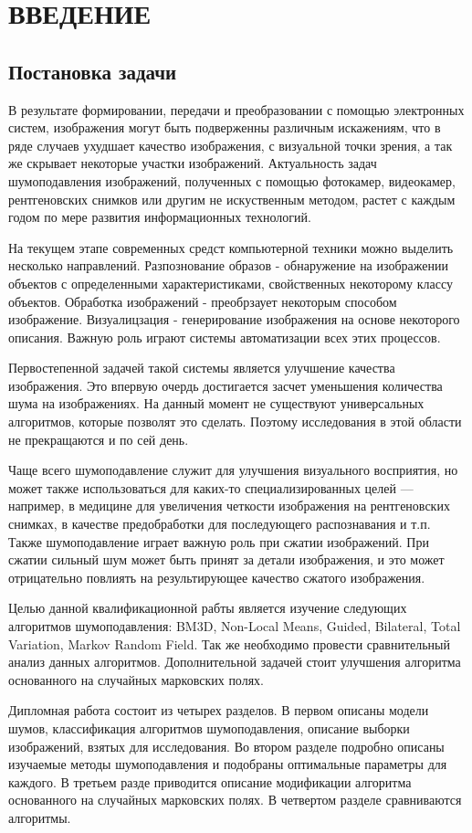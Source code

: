 \section{ВВЕДЕНИЕ}
\subsection{Постановка задачи}
В результате формировании, передачи и преобразовании с помощью электронных систем, изображения могут 
быть подверженны различным искажениям, что в ряде случаев ухудшает качество изображения, с визуальной
точки зрения, а так же скрывает некоторые участки изображений.
Актуальность задач шумоподавления  изображений, полученных с помощью фотокамер, видеокамер, рентгеновских снимков или другим не искуственным методом, растет с каждым годом по мере развития информационных технологий.

На текущем этапе современных средст компьютерной техники можно выделить несколько направлений.
Разпознование образов - обнаружение на изображении объектов с определенными характеристиками, свойственных
некоторому классу объектов. Обработка изображений - преобрзаует некоторым способом изображение. 
Визуалицзация - генерирование изображения на основе некоторого описания. Важную роль играют системы 
автоматизации всех этих процессов.

Первостепенной задачей такой системы является улучшение качества изображения. Это
впервую очердь достигается засчет уменьшения количества шума на изображениях. На данный 
момент не существуют универсальных алгоритмов, которые позволят это сделать. Поэтому 
исследования в этой области не прекращаются и по сей день.

Чаще всего шумоподавление служит для улучшения визуального восприятия, но
может также использоваться для каких-то специализированных целей — например, в
медицине для увеличения четкости изображения на рентгеновских снимках, в качестве
предобработки для последующего распознавания и т.п. Также шумоподавление играет
важную роль при сжатии изображений. При сжатии сильный шум может быть принят за
детали изображения, и это может отрицательно повлиять на результирующее качество
сжатого изображения.\cite{web:Kalinkina}

Целью данной квалификационной рабты является изучение следующих алгоритмов шумоподавления: BM3D,
Non-Local Means, Guided, Bilateral, Total Variation, Markov Random Field. Так же необходимо
провести сравнительный анализ данных алгоритмов. Дополнительной задачей стоит улучшения алгоритма
основанного на случайных марковских полях.

Дипломная работа состоит из четырех разделов. В первом описаны модели шумов, классификация алгоритмов шумоподавления, описание выборки изображений, взятых для исследования. Во втором разделе подробно описаны изучаемые методы
шумоподавления и подобраны оптимальные параметры для каждого. В третьем разде приводится  описание модификации алгоритма основанного на случайных марковских полях. В четвертом разделе сравниваются алгоритмы.
